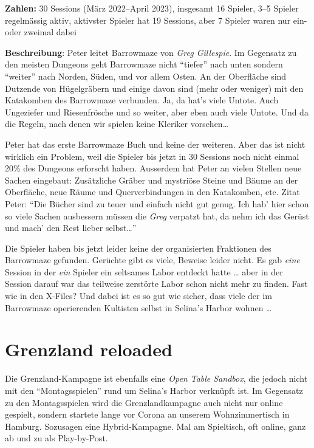 \documentclass[11pt]{wbzine}
\begin{document}
\begin{multicols}{2}
\textbf{Zahlen:} 30 Sessions (März 2022--April 2023),
insgesamt 16 Spieler,
3--5 Spieler regelmässig aktiv,
aktivster Spieler hat 19 Sessions,
aber 7 Spieler waren nur ein- oder zweimal dabei

\textbf{Beschreibung}: Peter leitet Barrowmaze von \textit{Greg Gillespie}.
Im Gegensatz zu den meisten Dungeons geht Barrowmaze nicht ``tiefer'' nach
unten sondern ``weiter'' nach Norden, Süden, und vor allem Osten. An der
Oberfläche sind Dutzende von Hügelgräbern und einige davon sind (mehr oder
weniger) mit den Katakomben des Barrowmaze verbunden. Ja, da hat's viele
Untote. Auch Ungeziefer und Riesenfrösche und so weiter, aber eben auch
viele Untote. Und da die Regeln, nach denen wir spielen keine Kleriker
vorsehen\dots{}

Peter hat das erste Barrowmaze Buch und keine der weiteren. Aber das ist
nicht wirklich ein Problem, weil die Spieler bis jetzt in 30 Sessions noch
nicht einmal 20\% des Dungeons erforscht haben. Ausserdem hat Peter an
vielen Stellen neue Sachen eingebaut: Zusätzliche Gräber und mystriöse
Steine und Bäume an der Oberfläche, neue Räume und Querverbindungen in
den Katakomben, etc. Zitat Peter: ``Die Bücher sind zu teuer und einfach
nicht gut genug. Ich hab' hier schon so viele Sachen ausbessern müssen die
\textit{Greg} verpatzt hat, da nehm ich das Gerüst und mach' den Rest
lieber selbst\dots{}''

Die Spieler haben bis jetzt leider keine der organisierten
Fraktionen des Barrowmaze gefunden. Gerüchte gibt es viele, Beweise
leider nicht. Es gab \emph{eine} Session in der \emph{ein} Spieler
ein seltsames Labor entdeckt hatte \dots{} aber in der Session
darauf war das teilweise zerstörte Labor schon nicht mehr zu finden.
Fast wie in den X-Files? Und dabei ist es so gut wie sicher, dass
viele der im Barrowmaze operierenden Kultisten selbst in Selina's
Harbor wohnen \dots{}

\section{Grenzland reloaded}
\label{grenzland-reloaded}
Die Grenzland-Kampagne ist ebenfalls eine \textit{Open Table Sandbox},
die jedoch nicht mit den ``Montagsspielen'' rund um Selina's Harbor
verknüpft ist. Im Gegensatz zu den Montagsspielen wird die
Grenzlandkampagne auch nicht nur online gespielt, sondern startete
lange vor Corona an unserem Wohnzimmertisch in Hamburg. Sozusagen
eine Hybrid-Kampagne. Mal am Spieltisch, oft online, ganz ab und zu
als Play-by-Post.


\end{multicols}
\end{document}
